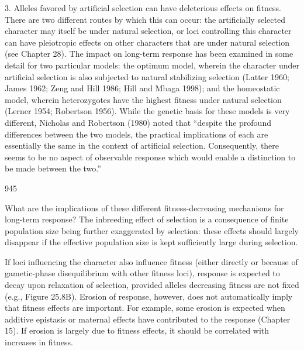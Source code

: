 \documentclass{article}
\begin{document}
3. Alleles favored by artificial selection can have deleterious effects on fitness. There are two different routes by which this can occur: the artificially selected character may itself be under natural selection, or loci controlling this character can have pleiotropic effects on other characters that are under natural selection (see Chapter 28). The impact on long-term response has been examined in some detail for two particular models: the optimum model, wherein the character under artificial selection is also subjected to natural stabilizing selection (Latter 1960; James 1962; Zeng and Hill 1986; Hill and Mbaga 1998); and the homeostatic model, wherein heterozygotes have the highest fitness under natural selection (Lerner 1954; Robertson 1956). While the genetic basis for these models is very different, Nicholas and Robertson (1980) noted that “despite the profound differences between the two models, the practical implications of each are essentially the same in the context of artificial selection. Consequently, there seems to be no aspect of observable response which would enable a distinction to be made between the two.”

945

What are the implications of these different fitness-decreasing mechanisms for long-term response? The inbreeding effect of selection is a consequence of finite population size being further exaggerated by selection: these effects should largely disappear if the effective population size is kept sufficiently large during selection.

If loci influencing the character also influence fitness (either directly or because of gametic-phase disequilibrium with other fitness loci), response is expected to decay upon relaxation of selection, provided alleles decreasing fitness are not fixed (e.g., Figure 25.8B). Erosion of response, however, does not automatically imply that fitness effects are important. For example, some erosion is expected when additive epistasis or maternal effects have contributed to the response (Chapter 15). If erosion is largely due to fitness effects, it should be correlated with increases in fitness.
\end{document}
